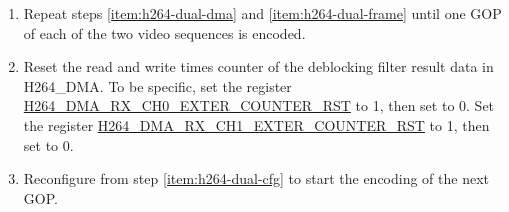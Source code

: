 \documentclass[main\_\_EN.tex]{subfiles}
\begin{document}
\begin{enumerate}
\begin{itemize}
\begin{enumerate}
        \end{enumerate}
        \item After any frame ends, the following registers corresponding to the currently encoded video sequence can be reconfigured:
        \begin{itemize}
            \item Registers related to the quantization result decimate function, refer to the description in chapter \ref{sec:h264-decimate}.
            \item Registers related to the MB level rate control function, refer to the description in chapter \ref{sec:h264-rate-ctrl}.
            \item Deblocking filter enable register: \hyperref[fielddesc:H264ABYPASSDBFILTER]{H264\_A\_BYPASS\_DB\_FILTER}.
            \item ROI function related registers, refer to the description in chapter \ref{sec:h264-roi}.
            \item Registers related to the slice header information: \hyperref[fielddesc:H264SLICEREMAINBIT]{H264\_SLICE\_REMAIN\_BIT}, \hyperref[fielddesc:H264SLICEREMAINBITLENGTH]{H264\_SLICE\_REMAIN\_BITLENGTH}, \hyperref[fielddesc:H264SLICEBYTELENGTH]{H264\_SLICE\_BYTE\_LENGTH}, \hyperref[fielddesc:H264SLICEBYTELSB]{H264\_SLICE\_BYTE\_LSB}, and \hyperref[fielddesc:H264SLICEBYTEMSB]{H264\_SLICE\_BYTE\_MSB}.
            \item Registers related to the MV merge function, refer to the description in chapter \ref{sec:h264-mv-merge}.
        \end{itemize}
    \end{itemize}
    \item Repeat steps \ref{item:h264-dual-dma} and \ref{item:h264-dual-frame} until one GOP of each of the two video sequences is encoded.
    \item Reset the read and write times counter of the deblocking filter result data in H264\_DMA. To be specific, set the register \hyperref[fielddesc:H264DMARXCH0EXTERCOUNTERRST]{H264\_DMA\_RX\_CH0\_EXTER\_COUNTER\_RST} to 1, then set to 0. Set the register \hyperref[fielddesc:H264DMARXCH1EXTERCOUNTERRST]{H264\_DMA\_RX\_CH1\_EXTER\_COUNTER\_RST} to 1, then set to 0.
    \item Reconfigure from step \ref{item:h264-dual-cfg} to start the encoding of the next GOP.
\end{enumerate}
\end{document}
